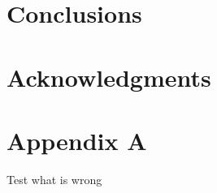 \documentclass{sig-alternate}
\begin{document}
\section{Conclusions}

\section{Acknowledgments}

%

%
%
\appendix
\section{Appendix A}
\label{sec:plots}

Test what is wrong
\end{document}
